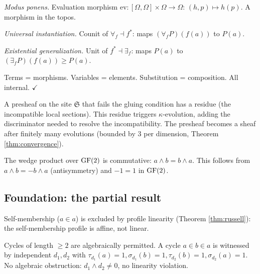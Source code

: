 \emph{Modus ponens.} Evaluation morphism
$\mathrm{ev}: [\Omega, \Omega] \times \Omega \to \Omega$:
$(h, p) \mapsto h(p)$. A morphism in the topos.

\emph{Universal instantiation.} Counit of
$\forall_f \dashv f^*$: maps $(\forall_f P)(f(a))$ to
$P(a)$.

\emph{Existential generalization.} Unit of
$f^* \dashv \exists_f$: maps $P(a)$ to
$(\exists_f P)(f(a)) \geq P(a)$.

Terms = morphisms. Variables = elements. Substitution =
composition. All internal. $\checkmark$


\begin{proposition}
\label{prop:presheaf-sheaf}
A presheaf on the site $\mathfrak{S}$ that fails the
gluing condition has a residue (the incompatible local
sections). This residue triggers $\kappa$-evolution,
adding the discriminator needed to resolve the
incompatibility. The presheaf becomes a sheaf after
finitely many evolutions (bounded by $3$ per dimension,
Theorem \ref{thm:convergence}).
\end{proposition}

\begin{proposition}
\label{prop:commutative}
The wedge product over $\operatorname{GF}(2)$ is commutative:
$a \wedge b = b \wedge a$. This follows from
$a \wedge b = -b \wedge a$ (antisymmetry) and $-1 = 1$
in $\operatorname{GF}(2)$.
\end{proposition}

\subsection{Foundation: the partial result}
\label{app:foundation-full}

Self-membership ($a \in a$) is excluded by profile
linearity (Theorem \ref{thm:russell}): the self-membership
profile is affine, not linear.

Cycles of length $\geq 2$ are algebraically permitted.
A cycle $a \in b \in a$ is witnessed by independent
$d_1, d_2$ with $\tau_{d_1}(a) = 1, \sigma_{d_1}(b) = 1,
\tau_{d_2}(b) = 1, \sigma_{d_2}(a) = 1$. No algebraic
obstruction: $d_1 \wedge d_2 \neq 0$, no linearity
violation.

